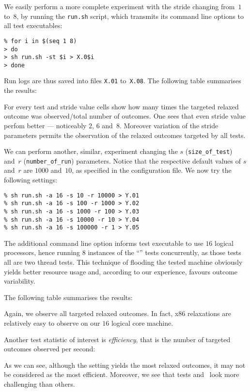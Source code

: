 We easily perform a more complete experiment with the stride changing
from~$1$ to~$8$, by running the \texttt{run.sh} script,
which transmits its command line options to all test executables:
\begin{verbatim}
% for i in $(seq 1 8)
> do
> sh run.sh -st $i > X.0$i
> done
\end{verbatim}
Run logs are thus saved into files \texttt{X.01} to~\texttt{X.08}.
The following table summarises the results:
\begin{center}\let\handletest\xhandletest

\end{center}
For every test and stride value cells show how many times the targeted relaxed
outcome was observed/total number of outcomes.
One sees that even stride value perfom better --- noticeably $2$, $6$ and~$8$.
Moreover variation of the stride parameters permits the observation of
the relaxed outcomes targeted by all tests.


We can perform another, similar, experiment changing the $s$ (\verb+size_of_test+) and~$r$ (\verb+number_of_run+) parameters.
Notice that the respective default values of $s$ and~$r$ are
$1000$ and~$10$, as specified in the 
configuration file.
We now try the following settings:
\begin{verbatim}
% sh run.sh -a 16 -s 10 -r 10000 > Y.01
% sh run.sh -a 16 -s 100 -r 1000 > Y.02
% sh run.sh -a 16 -s 1000 -r 100 > Y.03
% sh run.sh -a 16 -s 10000 -r 10 > Y.04
% sh run.sh -a 16 -s 100000 -r 1 > Y.05
\end{verbatim}
The additional   command line option informs test executable
to use $16$ logical processors, hence running $8$ instances of
the ``'' tests concurrently, as those tests all are two thread tests.
This technique of flooding the tested machine obviously
yields better resource usage
and, according to our experience, favours outcome variability.

The following table summarises the results:
\begin{center}\let\handletest\xhandletest

\end{center}
Again, we observe all targeted relaxed outcomes. In fact,
x86 relaxations are relatively easy to observe on our $16$
logical core machine.

Another test statistic of interest is
\emph{efficiency}, that is the number of targeted outcomes observed per
second:
\begin{center}\let\handletest\xhandletest

\end{center}
As we can see, although the setting  yields the most
relaxed outcomes, it may not be considered as the most efficient.
Moreover, we see that tests  and~
look more challenging than others.

